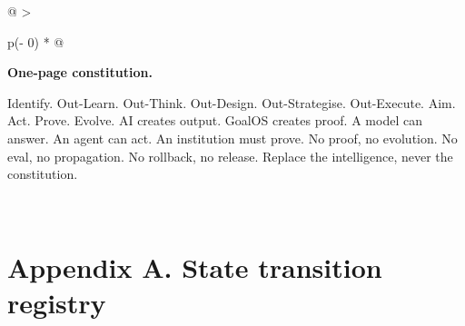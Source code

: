 \begin{longtable}[]{@{}
  >{\raggedright\arraybackslash}p{(\columnwidth - 0\tabcolsep) * }@{}}
\toprule\noalign{}
\begin{minipage}[b]{\linewidth}\raggedright
\textbf{One-page constitution.}

Identify. Out-Learn. Out-Think. Out-Design. Out-Strategise. Out-Execute.
Aim. Act. Prove. Evolve. AI creates output. GoalOS creates proof. A
model can answer. An agent can act. An institution must prove. No proof,
no evolution. No eval, no propagation. No rollback, no release. Replace
the intelligence, never the constitution.
\end{minipage} \\
\midrule\noalign{}
\endhead
\bottomrule\noalign{}
\endlastfoot
\end{longtable}

\section{Appendix A. State transition
registry}\label{appendix-a.-state-transition-registry}

